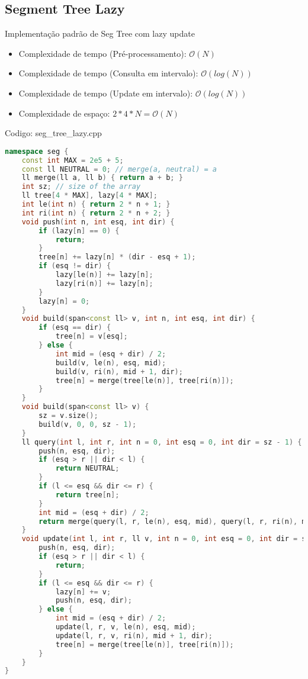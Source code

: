 \documentclass[10pt, a4paper, oneside]{book}
\begin{document}
\subsection{Segment Tree Lazy}


Implementação padrão de Seg Tree com lazy update



\begin{itemize}
\item Complexidade de tempo (Pré-processamento): $\mathcal{O}(N)$
\item Complexidade de tempo (Consulta em intervalo): $\mathcal{O}(log(N))$
\item Complexidade de tempo (Update em intervalo): $\mathcal{O}(log(N))$
\item Complexidade de espaço: $2 * 4 * N = \mathcal{O}(N)$
\end{itemize}

\hfill

Codigo: seg\_tree\_lazy.cpp

\begin{lstlisting}[language=C++]
namespace seg {
    const int MAX = 2e5 + 5;
    const ll NEUTRAL = 0; // merge(a, neutral) = a
    ll merge(ll a, ll b) { return a + b; }
    int sz; // size of the array
    ll tree[4 * MAX], lazy[4 * MAX];
    int le(int n) { return 2 * n + 1; }
    int ri(int n) { return 2 * n + 2; }
    void push(int n, int esq, int dir) {
        if (lazy[n] == 0) {
            return;
        }
        tree[n] += lazy[n] * (dir - esq + 1);
        if (esq != dir) {
            lazy[le(n)] += lazy[n];
            lazy[ri(n)] += lazy[n];
        }
        lazy[n] = 0;
    }
    void build(span<const ll> v, int n, int esq, int dir) {
        if (esq == dir) {
            tree[n] = v[esq];
        } else {
            int mid = (esq + dir) / 2;
            build(v, le(n), esq, mid);
            build(v, ri(n), mid + 1, dir);
            tree[n] = merge(tree[le(n)], tree[ri(n)]);
        }
    }
    void build(span<const ll> v) {
        sz = v.size();
        build(v, 0, 0, sz - 1);
    }
    ll query(int l, int r, int n = 0, int esq = 0, int dir = sz - 1) {
        push(n, esq, dir);
        if (esq > r || dir < l) {
            return NEUTRAL;
        }
        if (l <= esq && dir <= r) {
            return tree[n];
        }
        int mid = (esq + dir) / 2;
        return merge(query(l, r, le(n), esq, mid), query(l, r, ri(n), mid + 1, dir));
    }
    void update(int l, int r, ll v, int n = 0, int esq = 0, int dir = sz - 1) {
        push(n, esq, dir);
        if (esq > r || dir < l) {
            return;
        }
        if (l <= esq && dir <= r) {
            lazy[n] += v;
            push(n, esq, dir);
        } else {
            int mid = (esq + dir) / 2;
            update(l, r, v, le(n), esq, mid);
            update(l, r, v, ri(n), mid + 1, dir);
            tree[n] = merge(tree[le(n)], tree[ri(n)]);
        }
    }
}
\end{lstlisting}
\hfill
\end{document}
